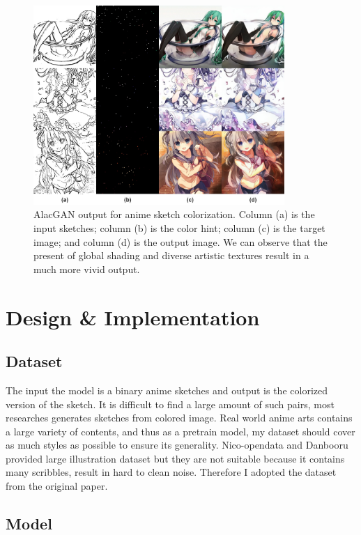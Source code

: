 \begin{figure}
    \centering
    \includegraphics[width=0.85\textwidth]{images/colorization/alacgan.jpg}
    \caption{AlacGAN output for anime sketch colorization. Column (a) is the input sketches; column (b) is the color hint; column (c) is the target image; and column (d) is the output image. We can observe that the present of global shading and diverse artistic textures result in a much more vivid output.}
    \label{fig:colorization_alacgan}
\end{figure}

\section{Design \& Implementation}
\subsection{Dataset}
The input the model is a binary anime sketches and output is the colorized version of the sketch. It is difficult to find a large amount of such pairs, most researches generates sketches from colored image. Real world anime arts contains a large variety of contents, and thus as a pretrain model, my dataset should cover as much styles as possible to ensure its generality. Nico-opendata\cite{Undefineda} and Danbooru\cite{branwenDanbooru2021LargeScaleCrowdsourced2015} provided large illustration dataset but they are not suitable because it contains many scribbles, result in hard to clean noise. Therefore I adopted the dataset from the original paper.

\subsection{Model}



